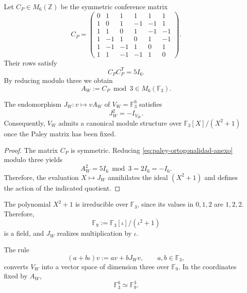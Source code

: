 Let \(C_P\in M_6(\mathbb Z)\) be the symmetric conference matrix
\begin{equation}
 C_P=
 \begin{pmatrix}
 0& 1& 1& 1& 1& 1\\
 1& 0& 1&-1&-1& 1\\
 1& 1& 0& 1&-1&-1\\
 1&-1& 1& 0& 1&-1\\
 1&-1&-1& 1& 0& 1\\
 1& 1&-1&-1& 1& 0
 \end{pmatrix}.
 \label{eq:paley-conferencia-anexo}
\end{equation}
Their rows satisfy
\begin{equation}
 C_P C_P^{\mathsf T}=5I_6.
 \label{eq:paley-ortogonalidad-anexo}
\end{equation}
By reducing modulo three we obtain
\begin{equation}
 A_W:=C_P\bmod 3\in M_6(\mathbb F_3).
 \label{eq:paley-reduccion-anexo}
\end{equation}

\begin{theorem}
\label{thm:raiz-interna-menos-uno-anexo}
The endomorphism \(J_W:v\mapsto vA_W\) of
\(V_W=\mathbb F_3^6\) satisfies
\begin{equation}
 J_W^2=-I_{V_W}.
 \label{eq:Jw-cuadrado-anexo}
\end{equation}
Consequently, \(V_W\) admits a canonical module structure over
\(\mathbb F_3[X]/(X^2+1)\) once the Paley matrix has been fixed.
\end{theorem}

\begin{proof}
The matrix \(C_P\) is symmetric. Reducing
\eqref{eq:paley-ortogonalidad-anexo} modulo three yields
\[
 A_W^2=5I_6\bmod3=2I_6=-I_6.
\]
Therefore, the evaluation \(X\mapsto J_W\) annihilates the ideal
\((X^2+1)\) and defines the action of the indicated quotient.
\end{proof}

The polynomial \(X^2+1\) is irreducible over \(\mathbb F_3\), since its
values in \(0,1,2\) are \(1,2,2\). Therefore,
\begin{equation}
 \mathbb F_9:=\mathbb F_3[\iota]/(\iota^2+1)
 \label{eq:F9-desde-paley-anexo}
\end{equation}
is a field, and \(J_W\) realizes multiplication by
\(\iota\).

\begin{corollary}
\label{cor:F3seis-F9tres-anexo}
The rule
\begin{equation}
 (a+b\iota)v:=av+bJ_Wv,
 \qquad a,b\in\mathbb F_3,
 \label{eq:accion-F9-anexo}
\end{equation}
converts \(V_W\) into a vector space of dimension three over
\(\mathbb F_9\). In the coordinates fixed by \(A_W\),
\begin{equation}
 \mathbb F_3^6\simeq\mathbb F_9^3.
 \label{eq:F3seis-igual-F9tres-anexo}
\end{equation}
\end{corollary}

